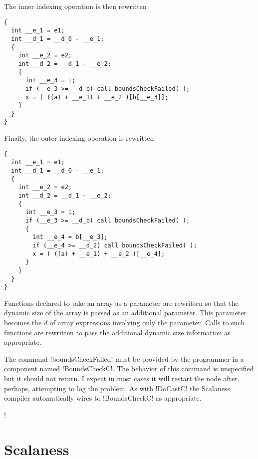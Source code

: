 The inner indexing operation is then rewritten

\singlespace
\begin{lstlisting}[language=nesC]
{
  int __e_1 = e1;
  int __d_1 = __d_0 - __e_1;
  {
    int __e_2 = e2;
    int __d_2 = __d_1 - __e_2;
    {
      int __e_3 = i;
      if (__e_3 >= __d_b) call boundsCheckFailed( );
      x = ( ((a) + __e_1) + __e_2 )[b[__e_3]];
    }
  }
}
\end{lstlisting}
\primaryspacing

Finally, the outer indexing operation is rewritten

\singlespace
\begin{lstlisting}[language=nesC]
{
  int __e_1 = e1;
  int __d_1 = __d_0 - __e_1;
  {
    int __e_2 = e2;
    int __d_2 = __d_1 - __e_2;
    {
      int __e_3 = i;
      if (__e_3 >= __d_b) call boundsCheckFailed( );
      {
        int __e_4 = b[__e_3];
        if (__e_4 >= __d_2) call boundsCheckFailed( );
        x = ( ((a) + __e_1) + __e_2 )[__e_4];
      }
    }
  }
}
\end{lstlisting}
\primaryspacing


Functions declared to take an array as a parameter are rewritten so that the dynamic size of the
array is passed as an additional parameter. This parameter becomes the $d$ of array expressions
involving only the parameter. Calls to such functions are rewritten to pass the additional
dynamic size information as appropriate.

The command !boundsCheckFailed! must be provided by the programmer in a component named
!BoundsCheckC!. The behavior of this command is unspecified but it should not return. I expect
in most cases it will restart the node after, perhaps, attempting to log the problem. As with
!DoCastC! the Scalaness compiler automatically wires to !BoundsCheckC! as appropriate.

\lstDeleteShortInline!

\section{Scalaness}
\label{section-scalaness}

